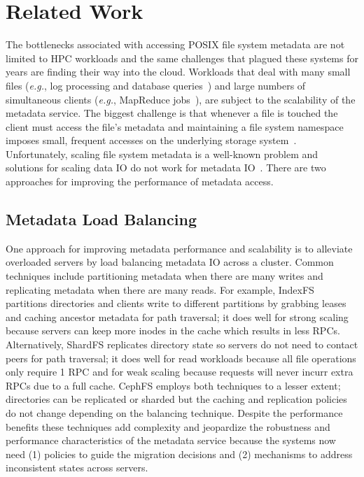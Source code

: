 \section{Related Work} 
\label{sec:related-work}

The bottlenecks associated with accessing POSIX file system metadata are not limited
to HPC workloads and the same challenges that plagued these systems for years are
finding their way into the cloud. Workloads that deal with many small files
({\it e.g.}, log processing and database
queries~\cite{thusoo:sigmod2010-facebook-infrastructure}) and large numbers of
simultaneous clients ({\it e.g.}, MapReduce
jobs~\cite{mckusick:acm2010-gfs-evolution}), are subject to the scalability of
the metadata service. The biggest challenge is that whenever a file
is touched the client must access the file's metadata and maintaining a file
system namespace imposes small, frequent accesses on the underlying storage
system~\cite{roselli:atec2000-FS-workloads}.  Unfortunately, scaling file
system metadata is a well-known problem and solutions for scaling data IO do
not work for metadata IO~\cite{roselli:atec2000-FS-workloads,
abad:techreport2012-fstrace, abad:ucc2012-mimesis,
alam:pdsw2011-metadata-scaling, weil:osdi2006-ceph}. There are two approaches
for improving the performance of metadata access.

\subsection{Metadata Load Balancing}

One approach for improving metadata performance and scalability is to alleviate
overloaded servers by load balancing metadata IO across a cluster. Common
techniques include partitioning metadata when there are many writes and
replicating metadata when there are many reads. For example, IndexFS partitions
directories and clients write to different partitions by grabbing leases and
caching ancestor metadata for path traversal; it does well for strong scaling
because servers can keep more inodes in the cache which results in less RPCs.
Alternatively, ShardFS replicates directory state so servers do not need to
contact peers for path traversal; it does well for read workloads because all
file operations only require 1 RPC and for weak scaling because requests will
never incurr extra RPCs due to a full cache.  CephFS employs both techniques to
a lesser extent; directories can be replicated or sharded but the caching and
replication policies do not change depending on the balancing technique.
Despite the performance benefits these techniques add complexity and jeopardize
the robustness and performance characteristics of the metadata service because
the systems now need (1) policies to guide the migration decisions and (2)
mechanisms to address inconsistent states across servers.


